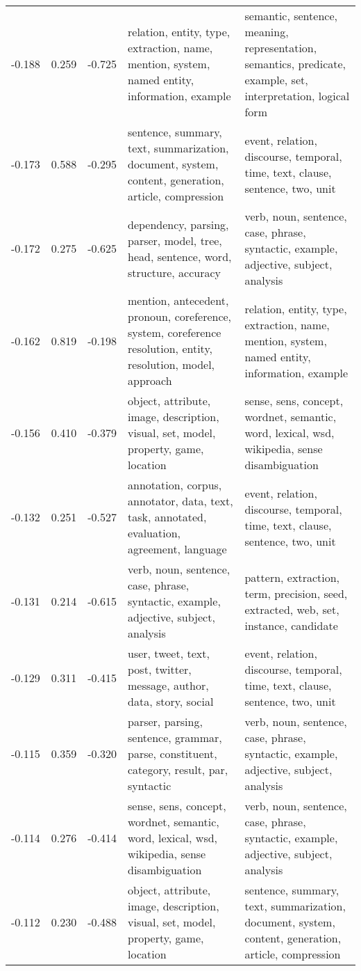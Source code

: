 \begin{tabular}{cccp{5cm}p{5cm}}
-0.188 & 0.259 & -0.725 & relation, entity, type, extraction, name, mention, system, named entity, information, example & semantic, sentence, meaning, representation, semantics, predicate, example, set, interpretation, logical form \\
-0.173 & 0.588 & -0.295 & sentence, summary, text, summarization, document, system, content, generation, article, compression & event, relation, discourse, temporal, time, text, clause, sentence, two, unit \\
-0.172 & 0.275 & -0.625 & dependency, parsing, parser, model, tree, head, sentence, word, structure, accuracy & verb, noun, sentence, case, phrase, syntactic, example, adjective, subject, analysis \\
-0.162 & 0.819 & -0.198 & mention, antecedent, pronoun, coreference, system, coreference resolution, entity, resolution, model, approach & relation, entity, type, extraction, name, mention, system, named entity, information, example \\
-0.156 & 0.410 & -0.379 & object, attribute, image, description, visual, set, model, property, game, location & sense, sens, concept, wordnet, semantic, word, lexical, wsd, wikipedia, sense disambiguation \\
-0.132 & 0.251 & -0.527 & annotation, corpus, annotator, data, text, task, annotated, evaluation, agreement, language & event, relation, discourse, temporal, time, text, clause, sentence, two, unit \\
-0.131 & 0.214 & -0.615 & verb, noun, sentence, case, phrase, syntactic, example, adjective, subject, analysis & pattern, extraction, term, precision, seed, extracted, web, set, instance, candidate \\
-0.129 & 0.311 & -0.415 & user, tweet, text, post, twitter, message, author, data, story, social & event, relation, discourse, temporal, time, text, clause, sentence, two, unit \\
-0.115 & 0.359 & -0.320 & parser, parsing, sentence, grammar, parse, constituent, category, result, par, syntactic & verb, noun, sentence, case, phrase, syntactic, example, adjective, subject, analysis \\
-0.114 & 0.276 & -0.414 & sense, sens, concept, wordnet, semantic, word, lexical, wsd, wikipedia, sense disambiguation & verb, noun, sentence, case, phrase, syntactic, example, adjective, subject, analysis \\
-0.112 & 0.230 & -0.488 & object, attribute, image, description, visual, set, model, property, game, location & sentence, summary, text, summarization, document, system, content, generation, article, compression \\

\end{tabular}
